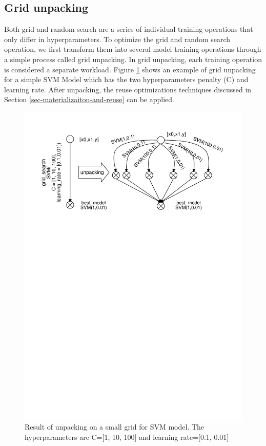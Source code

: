 \subsection{Grid unpacking}
Both grid and random search are a series of individual training operations that only differ in hyperparameters.
To optimize the grid and random search operation, we first transform them into several model training operations through a simple process called grid unpacking.
In grid unpacking, each training operation is considered a separate workload.
Figure \ref{fig-grid-unpacking} shows an example of grid unpacking for a simple SVM Model which has the two hyperparameters penalty (C) and learning rate.
After unpacking, the reuse optimizations techniques discussed in Section \ref{sec-materializaiton-and-reuse} can be applied.
\begin{figure}
\centering
\includegraphics[width=\columnwidth]{../images/grid-unpacking}
\caption{Result of unpacking on a small grid for SVM model. The hyperparameters are C=[1, 10, 100] and learning rate=[0.1, 0.01]}
\label{fig-grid-unpacking}
\end{figure}

